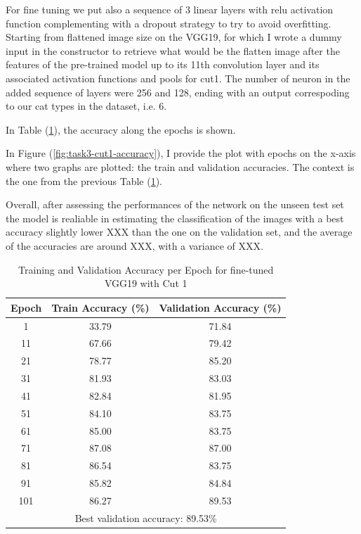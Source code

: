 \documentclass[11pt]{scrartcl}
\begin{document}
For fine tuning we put also a sequence of 3 linear layers 
with relu activation function complementing 
with a dropout strategy to try to avoid overfitting.
Starting from flattened image size on the VGG19,
for which I wrote a dummy input in the constructor to retrieve what would be the
flatten image after the features of the pre-trained model up to its 11th convolution
layer and its associated activation functions and pools for cut1.
The number of neuron in the added sequence of layers were 256 and 128, 
ending with an output correspoding to our cat types in the dataset, i.e. 6.

In Table (\ref{tab:task3-cut1-accuracy}),
the accuracy along the epochs is shown.

In Figure (\ref{fig:task3-cut1-accuracy}), 
I provide the plot with epochs on the x-axis where two graphs are plotted:
the train and validation accuracies.
The context is the one from the previous Table (\ref{tab:task3-cut1-accuracy}). 

Overall, after assessing the performances of the network on the unseen test set
the model is realiable in estimating the classification of the images with
a best accuracy slightly lower XXX than the one on the validation set,
and the average of the accuracies are around XXX,
with a variance of XXX.

\begin{table}[htbp]
\centering
\caption{Training and Validation Accuracy per Epoch for fine-tuned VGG19 with Cut 1}
\begin{tabular}{ccc}
\toprule
\textbf{Epoch} & \textbf{Train Accuracy (\%)} & \textbf{Validation Accuracy (\%)} \\
\midrule
1    & 33.79 & 71.84 \\
11   & 67.66 & 79.42 \\
21   & 78.77 & 85.20 \\
31   & 81.93 & 83.03 \\
41   & 82.84 & 81.95 \\
51   & 84.10 & 83.75 \\
61   & 85.00 & 83.75 \\
71   & 87.08 & 87.00 \\
81   & 86.54 & 83.75 \\
91   & 85.82 & 84.84 \\
101  & 86.27 & 89.53 \\
\midrule
\multicolumn{3}{c}{Best validation accuracy: 89.53\%} \\
\bottomrule
\end{tabular}
\label{tab:task3-cut1-accuracy}
\end{table}
\end{document}

